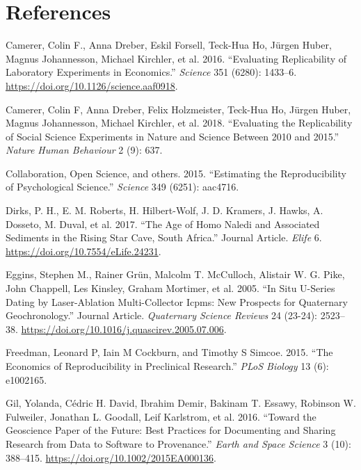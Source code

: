 \documentclass[]{elsarticle} %
\begin{document}
\newpage

\nolinenumbers

\hypertarget{references}{%
\section*{References}\label{references}}

\hypertarget{refs}{}
\leavevmode\hypertarget{ref-Camerer1433}{}%
Camerer, Colin F., Anna Dreber, Eskil Forsell, Teck-Hua Ho, Jürgen Huber, Magnus Johannesson, Michael Kirchler, et al. 2016. ``Evaluating Replicability of Laboratory Experiments in Economics.'' \emph{Science} 351 (6280): 1433--6. \url{https://doi.org/10.1126/science.aaf0918}.

\leavevmode\hypertarget{ref-camerer2018evaluating}{}%
Camerer, Colin F, Anna Dreber, Felix Holzmeister, Teck-Hua Ho, Jürgen Huber, Magnus Johannesson, Michael Kirchler, et al. 2018. ``Evaluating the Replicability of Social Science Experiments in Nature and Science Between 2010 and 2015.'' \emph{Nature Human Behaviour} 2 (9): 637.

\leavevmode\hypertarget{ref-open2015estimating}{}%
Collaboration, Open Science, and others. 2015. ``Estimating the Reproducibility of Psychological Science.'' \emph{Science} 349 (6251): aac4716.

\leavevmode\hypertarget{ref-Dirks2017}{}%
Dirks, P. H., E. M. Roberts, H. Hilbert-Wolf, J. D. Kramers, J. Hawks, A. Dosseto, M. Duval, et al. 2017. ``The Age of Homo Naledi and Associated Sediments in the Rising Star Cave, South Africa.'' Journal Article. \emph{Elife} 6. \url{https://doi.org/10.7554/eLife.24231}.

\leavevmode\hypertarget{ref-Eggins2005}{}%
Eggins, Stephen M., Rainer Grün, Malcolm T. McCulloch, Alistair W. G. Pike, John Chappell, Les Kinsley, Graham Mortimer, et al. 2005. ``In Situ U-Series Dating by Laser-Ablation Multi-Collector Icpms: New Prospects for Quaternary Geochronology.'' Journal Article. \emph{Quaternary Science Reviews} 24 (23-24): 2523--38. \url{https://doi.org/10.1016/j.quascirev.2005.07.006}.

\leavevmode\hypertarget{ref-freedman2015economics}{}%
Freedman, Leonard P, Iain M Cockburn, and Timothy S Simcoe. 2015. ``The Economics of Reproducibility in Preclinical Research.'' \emph{PLoS Biology} 13 (6): e1002165.

\leavevmode\hypertarget{ref-Gil_et_al_2016}{}%
Gil, Yolanda, Cédric H. David, Ibrahim Demir, Bakinam T. Essawy, Robinson W. Fulweiler, Jonathan L. Goodall, Leif Karlstrom, et al. 2016. ``Toward the Geoscience Paper of the Future: Best Practices for Documenting and Sharing Research from Data to Software to Provenance.'' \emph{Earth and Space Science} 3 (10): 388--415. \url{https://doi.org/10.1002/2015EA000136}.
\end{document}
